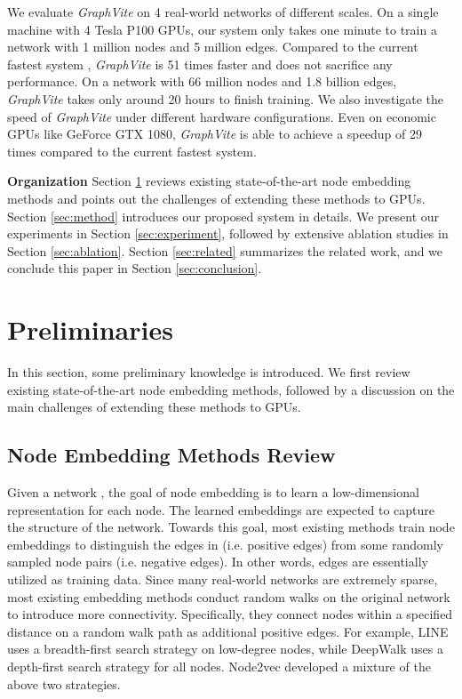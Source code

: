 \documentclass[sigconf]{acmart}
\newcommand{\Graphy}{\textit{GraphVite}\xspace}
\begin{document}
We evaluate \Graphy on 4 real-world networks of different scales. On a single machine with 4 Tesla P100 GPUs, our system only takes one minute to train a network with 1 million nodes and 5 million edges. Compared to the current fastest system \cite{tang2015line}, \Graphy is 51 times faster and does not sacrifice any performance. On a network with 66 million nodes and 1.8 billion edges, \Graphy takes only around 20 hours to finish training. We also investigate the speed of \Graphy under different hardware configurations. Even on economic GPUs like GeForce GTX 1080, \Graphy is able to achieve a speedup of 29 times compared to the current fastest system.

\noindent \textbf{Organization} Section \ref{sec:preliminary} reviews existing state-of-the-art node embedding methods and points out the challenges of extending these methods to GPUs. Section \ref{sec:method} introduces our proposed system in details. We present our experiments in Section \ref{sec:experiment}, followed by extensive ablation studies in Section \ref{sec:ablation}. Section \ref{sec:related} summarizes the related work, and we conclude this paper in Section \ref{sec:conclusion}. \section{Preliminaries}
\label{sec:preliminary}

In this section, some preliminary knowledge is introduced. We first review existing state-of-the-art node embedding methods, followed by a discussion on the main challenges of extending these methods to GPUs.

\subsection{Node Embedding Methods Review}
\label{sec:method_review}

Given a network , the goal of node embedding is to learn a low-dimensional representation for each node. The learned embeddings are expected to capture the structure of the network. Towards this goal, most existing methods train node embeddings to distinguish the edges in  (i.e. positive edges) from some randomly sampled node pairs (i.e. negative edges). In other words, edges are essentially utilized as training data. Since many real-world networks are extremely sparse, most existing embedding methods conduct random walks on the original network to introduce more connectivity. Specifically, they connect nodes within a specified distance on a random walk path as additional positive edges. For example, LINE \cite{tang2015line} uses a breadth-first search strategy on low-degree nodes, while DeepWalk \cite{perozzi2014deepwalk} uses a depth-first search strategy for all nodes. Node2vec \cite{grover2016node2vec} developed a mixture of the above two strategies.
\end{document}
